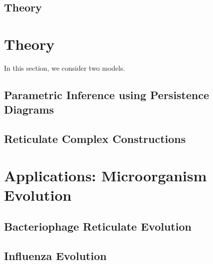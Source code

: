 \documentclass[letterpaper,12pt,twoside]{memoir}
\begin{document}
\thesistitlepage
\thesiscopyrightpage
\thesisabstract

\frontmatter

\tableofcontents
\cleardoublepage

\listoffigures
\cleardoublepage

\listoftables
\cleardoublepage

\thesisacknowledgements

\thesisdedication

\mainmatter



\chapter{Theory}
\label{ch:theory}


\part{Theory}
\label{part:theory}

In this section, we consider two models.

\chapter{Parametric Inference using Persistence Diagrams}
\label{ch:parametric_inference}

\lipsum

\chapter{Reticulate Complex Constructions}
\label{ch:complex_construction}
\lipsum

\part{Applications: Microorganism Evolution}
\label{part:microorganism}

\chapter{Bacteriophage Reticulate Evolution}
\label{ch:phage}
\lipsum

\chapter{Influenza Evolution}
\label{ch:influenza}

\end{document}
